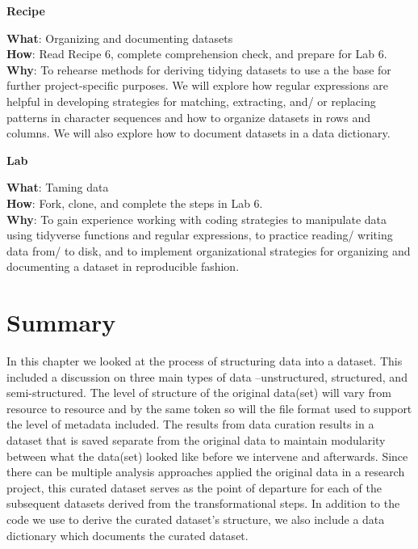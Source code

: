 \documentclass[
  letterpaper,
]{latex/krantz}
\theoremstyle{definition}
\theoremstyle{remark}
\begin{document}
\begin{tcolorbox}[enhanced jigsaw, colframe=quarto-callout-color-frame, breakable, bottomrule=.15mm, arc=.35mm, left=2mm, opacityback=0, rightrule=.15mm, colback=white, toprule=.15mm, leftrule=.75mm]

\textbf{ Recipe}

\textbf{What}: Organizing and documenting datasets\\
\textbf{How}: Read Recipe 6, complete comprehension check, and prepare
for Lab 6.\\
\textbf{Why}: To rehearse methods for deriving tidying datasets to use a
the base for further project-specific purposes. We will explore how
regular expressions are helpful in developing strategies for matching,
extracting, and/ or replacing patterns in character sequences and how to
organize datasets in rows and columns. We will also explore how to
document datasets in a data dictionary.

\end{tcolorbox}

\begin{tcolorbox}[enhanced jigsaw, colframe=quarto-callout-color-frame, breakable, bottomrule=.15mm, arc=.35mm, left=2mm, opacityback=0, rightrule=.15mm, colback=white, toprule=.15mm, leftrule=.75mm]

\textbf{ Lab}

\textbf{What}: Taming data\\
\textbf{How}: Fork, clone, and complete the steps in Lab 6.\\
\textbf{Why}: To gain experience working with coding strategies to
manipulate data using tidyverse functions and regular expressions, to
practice reading/ writing data from/ to disk, and to implement
organizational strategies for organizing and documenting a dataset in
reproducible fashion.

\end{tcolorbox}

\section*{Summary}\label{summary-5}


In this chapter we looked at the process of structuring data into a
dataset. This included a discussion on three main types of data
--unstructured, structured, and semi-structured. The level of structure
of the original data(set) will vary from resource to resource and by the
same token so will the file format used to support the level of metadata
included. The results from data curation results in a dataset that is
saved separate from the original data to maintain modularity between
what the data(set) looked like before we intervene and afterwards. Since
there can be multiple analysis approaches applied the original data in a
research project, this curated dataset serves as the point of departure
for each of the subsequent datasets derived from the transformational
steps. In addition to the code we use to derive the curated dataset's
structure, we also include a data dictionary which documents the curated
dataset.
\end{document}
